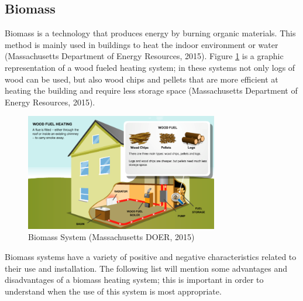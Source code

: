     \subsection{Biomass}
    \par Biomass is a technology that produces energy by burning organic materials. This method is mainly used in buildings to heat the indoor environment or water (Massachusetts Department of Energy Resources, 2015). Figure \ref{fig:bio} is a graphic representation of a wood fueled heating system; in these systems not only logs of wood can be used, but also wood chips and pellets that are more efficient at heating the building and require less storage space (Massachusetts Department of Energy Resources, 2015).
    \begin{figure}[h]
      \centering
        \includegraphics[width=0.75\textwidth]{images/05-BiomassSystem}
      \caption{Biomass System (Massachusetts DOER, 2015)}
      \label{fig:bio}
    \end{figure}
    \par Biomass systems have a variety of positive and negative characteristics related to their use and installation. The following list will mention some advantages and disadvantages of a biomass heating system; this is important in order to understand when the use of this system is most appropriate.\\
    
